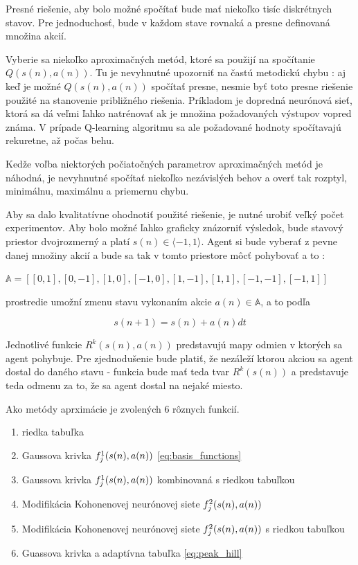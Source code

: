 Presné riešenie, aby bolo možné spočítať bude mať niekoľko tisíc diskrétnych stavov.
Pre jednoduchosť, bude v každom stave rovnaká a presne definovaná množina akcií.

Vyberie sa niekoľko aproximačných metód, ktoré sa použijí na spočítanie $Q(s(n), a(n))$.
Tu je nevyhnutné upozorniť na častú metodickú chybu : aj keď je možné $Q(s(n), a(n))$
spočítať presne, nesmie byť toto presne riešenie použité na stanovenie približného riešenia.
Príkladom je dopredná neurónová sieť, ktorá sa dá veľmi ľahko natrénovať ak je množina požadovaných
výstupov vopred známa. V prípade Q-learning algoritmu sa ale požadované hodnoty spočítavajú
rekuretne, až počas behu.

Kedže voľba niektorých počiatočných parametrov aproximačných metód je náhodná,
je nevyhnutné spočítať niekoľko nezávislých behov a overť tak rozptyl, minimálnu, maximálnu
a priemernu chybu.


Aby sa dalo kvalitatívne ohodnotiť použité riešenie, je nutné urobiť veľký počet experimentov.
Aby bolo možné ľahko graficky znázorniť výsledok, bude stavový priestor dvojrozmerný a platí
$s(n) \in \langle -1, 1 \rangle$.
Agent si bude vyberať z pevne danej množiny akcií a bude sa tak v tomto priestore môcť pohybovať a to :

$\mathbb{A} = [ [0, 1], [0, -1], [1,  0], [-1, 0], [1, -1], [1, 1], [-1, -1], [-1, 1]] $

prostredie umožní zmenu stavu vykonaním akcie $a(n) \in \mathbb{A}$, a to podľa

\begin{equation}
s(n+1) = s(n) + a(n){dt}
\label{eq:q_learning_next_state}
\end{equation}

Jednotlivé funkcie $R^k(s(n), a(n))$ predstavujú mapy odmien v ktorých sa agent pohybuje. Pre zjednodušenie
bude platiť, že nezáleží ktorou akciou sa agent dostal do daného stavu - funkcia bude
mať teda tvar $R^k(s(n))$ a predstavuje teda odmenu za to, že sa agent dostal na nejaké miesto.

Ako metódy aprximácie je zvolených 6 rôznych funkcií.

\begin{enumerate}
\item riedka tabuľka
\item Gaussova krivka $f_j^1(\boldmath{s(n), a(n)})$ \ref{eq:basis_functions}
\item Gaussova krivka $f_j^1(\boldmath{s(n), a(n)})$ kombinovaná s riedkou tabuľkou
\item Modifikácia Kohonenovej neurónovej siete $f_j^2(\boldmath{s(n), a(n)})$
\item Modifikácia Kohonenovej neurónovej siete $f_j^2(\boldmath{s(n), a(n)})$ s riedkou tabuľkou
\item Guassova krivka a adaptívna tabuľka \ref{eq:peak_hill}
\end{enumerate}

